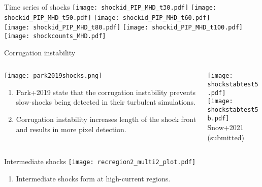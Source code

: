 \documentclass[10pt,aspectratio=169,usenames,dvipsnames]{beamer}
\begin{document}
\begin{frame}{Time series of shocks}
    \texttt{[image: shockid\_PIP\_MHD\_t30.pdf]}
    \texttt{[image: shockid\_PIP\_MHD\_t50.pdf]} 
    \texttt{[image: shockid\_PIP\_MHD\_t60.pdf]} \\
    \texttt{[image: shockid\_PIP\_MHD\_t80.pdf]} 
    \texttt{[image: shockid\_PIP\_MHD\_t100.pdf]}
    \texttt{[image: shockcounts\_MHD.pdf]} %
\end{frame}

\begin{frame}{Corrugation instability}
\begin{columns}
\begin{column}{0.5\textwidth}
\texttt{[image: park2019shocks.png]}
\begin{enumerate}
    \item Park+2019 state that the corrugation instability prevents slow-shocks being detected in their turbulent simulations.
    \item Corrugation instability increases length of the shock front and results in more pixel detection.
\end{enumerate}
\end{column}
\begin{column}{0.5\textwidth}
\texttt{[image: shockstabtest5.pdf]} \\
\texttt{[image: shockstabtest5b.pdf]} \\ {\small Snow+2021 (submitted)}
\end{column}
\end{columns}
\end{frame}

\begin{frame}{Intermediate shocks}
\texttt{[image: recregion2\_multi2\_plot.pdf]}
\begin{enumerate}
\item Intermediate shocks form at high-current regions.
\end{enumerate}
\end{frame}
\end{document}
